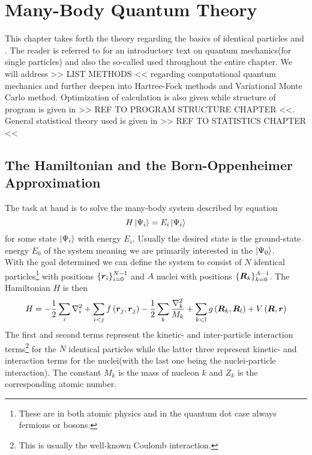 \chapter{Many-Body Quantum Theory\label{chapter:3}}     
    This chapter takes forth the theory regarding the basics of identical
    particles and . The reader is referred
    to \cite{GriffQuan} for an introductory text on quantum mechanics(for
    single particles) and also the so-called  used
    throughout the entire chapter. We will address >> LIST METHODS << regarding
    computational quantum mechanics and further deepen into Hartree-Fock
    methods and Variational Monte Carlo method. Optimization of calculation is
    also given while structure of program is given in >> REF TO PROGRAM
    STRUCTURE CHAPTER <<. General statistical theory used is given in >> REF TO
    STATISTICS CHAPTER <<

\section{The Hamiltonian and the Born-Oppenheimer Approximation\label{sec:3.1}}
    The task at hand is to solve the many-body system described by
     equation
        \begin{equation}
            H\ket{\Psi_i} = E_i\ket{\Psi_i}
            \label{eq:SE}
        \end{equation}
    for some state $\ket{\Psi_i}$ with energy $E_i$. Usually the desired state
    is the ground-state energy $E_0$ of the system meaning we are primarily
    interested in the  $\ket{\Psi_0}$. \\ With the goal
    determined we can define the system to consist of $N$ identical
    particles\footnote{These are in both atomic physics and in the quantum dot
    case always fermions or bosons.} with positions
    $\{\boldsymbol{{r}}_i\}^{N-1}_{i=0}$ and $A$ nuclei with positions
    $\{\boldsymbol{{R}}_k\}^{A-1}_{k=0}$. The Hamiltonian $H$ is then
        \begin{equation}
            H = - \frac{1}{2} \sum\limits_i \nabla^2_i + \sum_{i<j}
            f\left(\boldsymbol{{r}}_j, \boldsymbol{{r}}_j\right) - \frac{1}{2} \sum_k
            \frac{\nabla^2_k}{M_k} + \sum_{k<l}
            g\left(\boldsymbol{{R}}_k,\boldsymbol{{R}}_l\right) +
            V\left(\boldsymbol{{R}},\boldsymbol{{r}}\right)
        \end{equation}
    The first and second terms represent the kinetic- and inter-particle
    interaction terms\footnote{This is usually the well-known Coulomb
    interaction.} for the $N$ identical particles while the latter three
    represent kinetic- and interaction terms for the nuclei(with the last one
    being the nuclei-particle interaction). The constant $M_k$ is the mass of
    nucleon $k$ and $Z_k$ is the corresponding atomic number.

